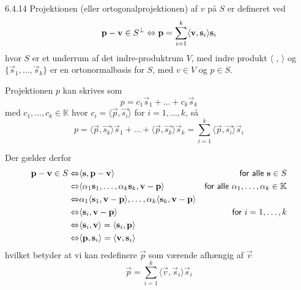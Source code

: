 %
%

\begin{saetning}{6.4.14}
	Projektionen (eller ortogonalprojektionen) af $v$ på $S$ er defineret ved
	\[
		\mathbf{p} -\mathbf{v} \in S^\bot \Leftrightarrow \mathbf{p} = \sum^k_{i=1} \langle
		\mathbf{v}, \mathbf{s}_i \rangle \mathbf{s}_i
	\]
	hvor $S$ er et underrum af det indre-produktrum $V$, med indre produkt
	$\langle$ , $\rangle$ og $\{\vec{s}_1, \dotsc, \vec{s}_k\}$ er en
	ortonormalbasis for $S$, med $v \in V$ og $p \in S$.
\end{saetning}

\begin{bevis}
	Projektionen $p$ kan skrives som
	\[
		p=c_1 \vec{s}_1 + \dotso + c_k \vec{s}_k
	\]
	med $c_1, \dotsc, c_k \in \mathbb{K}$ hvor $c_i = \langle \vec{p},
	\vec{s_i} \rangle$ for $i=1,\dotsc,k$, så
	\[
		p=\langle \vec{p},	\vec{s_k} \rangle \vec{s}_1 + \dotso + \langle
		\vec{p}, \vec{s_k} \rangle \vec{s}_k = \sum^k_{i=1} \langle \vec{p},
		\vec{s_i} \rangle \vec{s}_i
	\]

	\noindent Der gælder derfor
	\begin{align*}
		\mathbf{p} - \mathbf{v} \in S \Leftrightarrow & \langle \mathbf{s}, \mathbf{p} - \mathbf{v}
				\rangle & \textsf{for alle } \mathbf{s} \in S \\
			\Leftrightarrow & \langle \alpha_1 \mathbf{s}_1, \dotsc, \alpha_k \mathbf{s}_k, 
				\mathbf{v} - \mathbf{p} \rangle & \textsf{for alle } \alpha_1, \dotsc,
				\alpha_k \in \mathbb{K} \\
			\Leftrightarrow & \alpha_1 \langle \mathbf{s}_1, \mathbf{v} - \mathbf{p} \rangle,
				\dotsc, \alpha_k \langle \mathbf{s}_k, \mathbf{v} -\mathbf{p} \rangle \\
			\Leftrightarrow & \langle \mathbf{s}_i, \mathbf{v} - \mathbf{p} \rangle & \textsf{for }
				i = 1, \dotsc, k \\
			\Leftrightarrow & \langle \mathbf{s}_i, \mathbf{v} \rangle = \langle
				\mathbf{s}_i, \mathbf{p} \rangle \\
			\Leftrightarrow & \langle \mathbf{p}, \mathbf{s}_i \rangle = \langle
				\mathbf{v}, \mathbf{s}_i \rangle
	\end{align*}
	hvilket betyder at vi kan redefinere $\vec{p}$ som værende afhængig af
	$\vec{v}$
	\[
		\vec{p} = \sum^k_{i=1} \langle \vec{v}, \vec{s}_i \rangle \vec{s}_i
	\]
\end{bevis}

